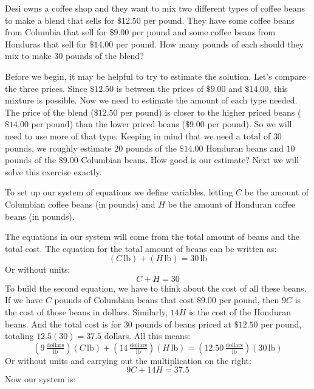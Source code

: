 \documentclass[nooutcomes]{ximera}
\begin{document}
\begin{example}
          Desi owns a coffee shop and they want to mix two different types of coffee beans to make a blend that sells for $\$12.50$ per pound.
          They have some coffee beans from Columbia that sell for $\$9.00$ per pound and some coffee beans from Honduras that sell for $\$14.00$ per pound.
          How many pounds of each should they mix to make $30$ pounds of the blend?
\begin{explanation}
          Before we begin, it may be helpful to try to estimate the solution.
          Let's compare the three prices.
          Since $\$12.50$ is between the prices of $\$9.00$ and $\$14.00$,
          this mixture is possible.
          Now we need to estimate the amount of each type needed.
          The price of the blend ($\$12.50$ per pound) is closer to the higher priced beans ($\$14.00$ per pound) than the lower priced beans
          ($\$9.00$ per pound).
          So we will need to use more of that type.
          Keeping in mind that we need a total of $30$ pounds,
          we roughly estimate $20$ pounds of the $\$14.00$ Honduran beans and $10$ pounds of the $\$9.00$ Columbian beans.
          How good is our estimate?
          Next we will solve this exercise exactly.

          To set up our system of equations we define variables,
          letting $C$ be the amount of Columbian coffee beans
          (in pounds)
          and $H$ be the amount of Honduran coffee beans
          (in pounds).

          The equations in our system will come from the total amount of beans and the total cost.
          The equation for the total amount of beans can be written as:
      $$    
            (C\,\text{lb})+(H\,\text{lb})=30\,\text{lb}
   $$     
          Or without units:
         $$
            C+H=30
$$
          To build the second equation,
          we have to think about the cost of all these beans.
          If we have $C$ pounds of Columbian beans that cost $\$9.00$ per pound,
          then $9C$ is the cost of those beans in dollars.
          Similarly, $14H$ is the cost of the Honduran beans.
          And the total cost is for $30$ pounds of beans priced at $\$12.50$ per pound,
          totaling $12.5(30)=37.5$ dollars.
          All this means:
    $$      
            \left(9\,\tfrac{\text{dollars}}{\text{lb}}\right)(C\,\text{lb})+\left(14\,\tfrac{\text{dollars}}{\text{lb}}\right)(H\,\text{lb})=\left(12.50\,\tfrac{\text{dollars}}{\text{lb}}\right)(30\,\text{lb})
 $$
          Or without units and carrying out the multiplication on the right:
     $$
            9C+14H=37.5
$$
          Now our system is:


\end{explanation}
\end{example}
\end{document}
